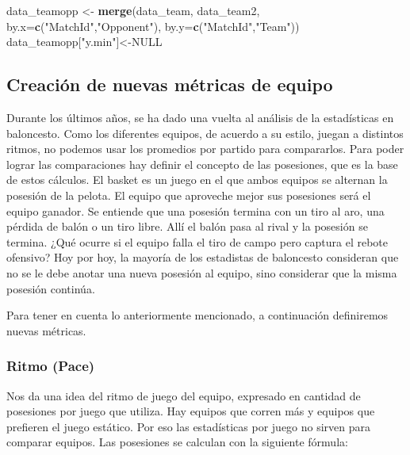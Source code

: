 \documentclass[
]{article}
\newenvironment{Shaded}{\begin{snugshade}}{\end{snugshade}}
\newcommand{\DataTypeTok}[1]{\textcolor[rgb]{0.13,0.29,0.53}{#1}}
\newcommand{\KeywordTok}[1]{\textcolor[rgb]{0.13,0.29,0.53}{\textbf{#1}}}
\newcommand{\NormalTok}[1]{#1}
\newcommand{\OtherTok}[1]{\textcolor[rgb]{0.56,0.35,0.01}{#1}}
\newcommand{\StringTok}[1]{\textcolor[rgb]{0.31,0.60,0.02}{#1}}
\begin{document}
\begin{Shaded}
\begin{Highlighting}[]
\NormalTok{data_teamopp <-}\StringTok{ }\KeywordTok{merge}\NormalTok{(data_team, data_team2, }\DataTypeTok{by.x=}\KeywordTok{c}\NormalTok{(}\StringTok{"MatchId"}\NormalTok{,}\StringTok{"Opponent"}\NormalTok{),  }
                      \DataTypeTok{by.y=}\KeywordTok{c}\NormalTok{(}\StringTok{"MatchId"}\NormalTok{,}\StringTok{"Team"}\NormalTok{))}
\NormalTok{data_teamopp[}\StringTok{"y.min"}\NormalTok{]<-}\OtherTok{NULL}
\end{Highlighting}
\end{Shaded}

\newpage

\hypertarget{creaciuxf3n-de-nuevas-muxe9tricas-de-equipo}{%
\subsection{Creación de nuevas métricas de
equipo}\label{creaciuxf3n-de-nuevas-muxe9tricas-de-equipo}}

Durante los últimos años, se ha dado una vuelta al análisis de la
estadísticas en baloncesto. Como los diferentes equipos, de acuerdo a su
estilo, juegan a distintos ritmos, no podemos usar los promedios por
partido para compararlos. Para poder lograr las comparaciones hay
definir el concepto de las posesiones, que es la base de estos cálculos.
El basket es un juego en el que ambos equipos se alternan la posesión de
la pelota. El equipo que aproveche mejor sus posesiones será el equipo
ganador. Se entiende que una posesión termina con un tiro al aro, una
pérdida de balón o un tiro libre. Allí el balón pasa al rival y la
posesión se termina. ¿Qué ocurre si el equipo falla el tiro de campo
pero captura el rebote ofensivo? Hoy por hoy, la mayoría de los
estadistas de baloncesto consideran que no se le debe anotar una nueva
posesión al equipo, sino considerar que la misma posesión continúa.

Para tener en cuenta lo anteriormente mencionado, a continuación
definiremos nuevas métricas.

\hypertarget{ritmo-pace}{%
\subsubsection{Ritmo (Pace)}\label{ritmo-pace}}

Nos da una idea del ritmo de juego del equipo, expresado en cantidad de
posesiones por juego que utiliza. Hay equipos que corren más y equipos
que prefieren el juego estático. Por eso las estadísticas por juego no
sirven para comparar equipos. Las posesiones se calculan con la
siguiente fórmula:
\end{document}
